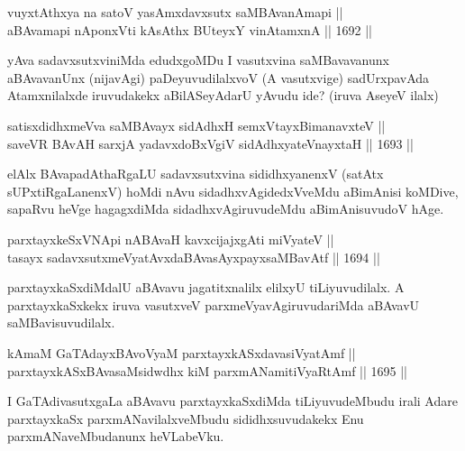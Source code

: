 \begin{shl}
vuyxtAthxya na satoV yasAmxdavxsutx saMBAvanAmapi || \\
aBAvamapi nA\s \s ponxVti kA\s \s sAthx BUteyxY vinA\s \s tamxnA \hfill || 1692 ||  
\end{shl}

\begin{artha}
yAva sadavxsutxviniMda edudxgoMDu I vasutxvina saMBavavanunx aBAvavanUnx (nijavAgi) paDeyuvudilalxvoV (A vasutxvige) sadUrxpavAda Atamxnilalxde iruvudakekx aBilASeyAdarU yAvudu ide? (iruva AseyeV ilalx)
\end{artha}


\begin{shl}
satisxdidhxmeVva saMBAvayx sidAdhxH semxVtayxBimanavxteV || \\
saveVR BAvAH sarxjA yadavxdoBxVgiV sidAdhxyateV\s nayxtaH \hfill || 1693 ||  
\end{shl}	

\begin{artha}
elAlx BAvapadAthaRgaLU sadavxsutxvina sididhxyanenxV (satAtx sUPxtiRgaLanenxV) hoMdi nAvu sidadhxvAgidedxVveMdu aBimAnisi koMDive, sapaRvu heVge hagagxdiMda sidadhxvAgiruvudeMdu aBimAnisuvudoV hAge.
\end{artha}


\begin{shl}
parxtayxkeSxVNApi nABAvaH kavxcijajxgAti miVyateV || \\
tasayx sadavxsutxmeVyatAvxdaBAvasAyxpayxsaMBavAtf \hfill || 1694 ||  
\end{shl}

\begin{artha}
parxtayxkaSxdiMdalU aBAvavu jagatitxnalilx elilxyU tiLiyuvudilalx. A parxtayxkaSxkekx iruva vasutxveV parxmeVyavAgiruvudariMda aBAvavU saMBavisuvudilalx.
\end{artha}

\begin{shl}
kAmaM GaTAdayxBAvoV\s yaM parxtayxkASxdavasiVyatAmf || \\
parxtayxkASxBAvasaMsidwdhx kiM parxmANamitiVyaRtAmf \hfill || 1695 ||  
\end{shl}

\begin{artha}
I GaTAdivasutxgaLa aBAvavu parxtayxkaSxdiMda tiLiyuvudeMbudu irali Adare parxtayxkaSx parxmANavilalxveMbudu sididhxsuvudakekx Enu parxmANaveMbudanunx heVLabeVku.
\end{artha}

